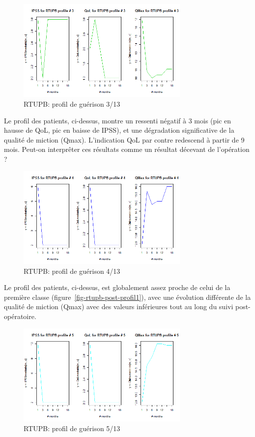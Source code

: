 \begin{figure}[H]
\centering
\includegraphics[width=0.75\textwidth]{../Fig/RTUPB/rtupb-profil-post-03.png}
\caption[]{RTUPB: profil de guérison 3/13}
\label{fig-rtupb-post-profil3}
\end{figure}

Le profil des patients, ci-dessus, montre un ressenti négatif à 3 mois (pic en hausse de QoL, pic en baisse de IPSS), et une dégradation significative de la qualité de miction (Qmax). L'indication QoL par contre redescend à partir de 9 mois. Peut-on interprêter ces résultats comme un résultat décevant de l'opération ?

\begin{figure}[H]
\centering
\includegraphics[width=0.75\textwidth]{../Fig/RTUPB/rtupb-profil-post-04.png}
\caption[]{RTUPB: profil de guérison 4/13}
\label{fig-rtupb-post-profil4}
\end{figure}

Le profil des patients, ci-dessus, est globalement assez proche de celui de la première classe (figure~\ref{fig-rtupb-post-profil1}), avec une évolution différente de la qualité de miction (Qmax) avec des valeurs inférieures tout au long du suivi post-opératoire.

\begin{figure}[H]
\centering
\includegraphics[width=0.75\textwidth]{../Fig/RTUPB/rtupb-profil-post-05.png}
\caption[]{RTUPB: profil de guérison 5/13}
\label{fig-rtupb-post-profil5}
\end{figure}

